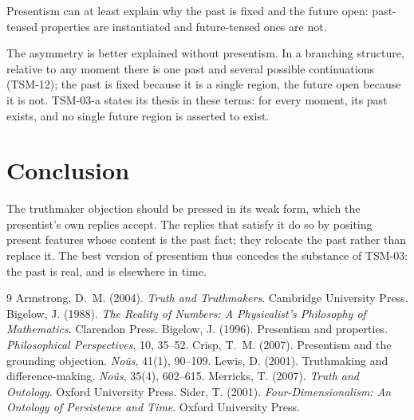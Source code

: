 \documentclass{situationist-preprint}
\begin{document}
\begin{objection}
Presentism can at least explain why the past is fixed and the future open: past-tensed properties are instantiated and future-tensed ones are not.
\end{objection}

\begin{reply}
The asymmetry is better explained without presentism. In a branching structure, relative to any moment there is one past and several possible continuations (TSM-12); the past is fixed because it is a single region, the future open because it is not. TSM-03-a states its thesis in these terms: for every moment, its past exists, and no single future region is asserted to exist.
\end{reply}

\section{Conclusion}

The truthmaker objection should be pressed in its weak form, which the presentist's own replies accept. The replies that satisfy it do so by positing present features whose content is the past fact; they relocate the past rather than replace it. The best version of presentism thus concedes the substance of TSM-03: the past is real, and is elsewhere in time.

\begin{thebibliography}{9}
 Armstrong, D.~M. (2004). \emph{Truth and Truthmakers}. Cambridge University Press.
 Bigelow, J. (1988). \emph{The Reality of Numbers: A Physicalist's Philosophy of Mathematics}. Clarendon Press.
 Bigelow, J. (1996). Presentism and properties. \emph{Philosophical Perspectives}, 10, 35--52.
 Crisp, T.~M. (2007). Presentism and the grounding objection. \emph{No\^us}, 41(1), 90--109.
 Lewis, D. (2001). Truthmaking and difference-making. \emph{No\^us}, 35(4), 602--615.
 Merricks, T. (2007). \emph{Truth and Ontology}. Oxford University Press.
 Sider, T. (2001). \emph{Four-Dimensionalism: An Ontology of Persistence and Time}. Oxford University Press.
\end{thebibliography}
\end{document}
